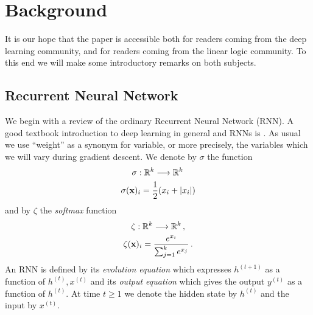 \documentclass[english,letter paper,12pt,leqno]{article}
\theoremstyle{example}
\numberwithin{equation}{section}
\begin{document}




\section{Background}

It is our hope that the paper is accessible both for readers coming from the deep learning community, and for readers coming from the linear logic community. To this end we will make some introductory remarks on both subjects.

\subsection{Recurrent Neural Network}

We begin with a review of the ordinary Recurrent Neural Network (RNN). A good textbook introduction to deep learning in general and RNNs is \cite{dlbook}. As usual we use ``weight'' as a synonym for variable, or more precisely, the variables which we will vary during gradient descent. We denote by $\sigma$ the function
\begin{gather*}
\sigma: \mathbb{R}^k \longrightarrow \mathbb{R}^k\,\\
\sigma( \bold{x} )_i = \frac{1}{2}( x_i + |x_i| )
\end{gather*}
and by $\zeta$ the \emph{softmax} function
\begin{gather*}
\zeta: \mathbb{R}^k \longrightarrow \mathbb{R}^k\,,\\
\zeta(\bold{x})_i = \frac{e^{x_i}}{\sum_{j=1}^k e^{x_j}}\,.
\end{gather*}
An RNN is defined by its \emph{evolution equation} which expresses $h^{(t+1)}$ as a function of $h^{(t)}, x^{(t)}$ and its \emph{output equation} which gives the output $y^{(t)}$ as a function of $h^{(t)}$. At time $t \ge 1$ we denote the hidden state by $h^{(t)}$ and the input by $x^{(t)}$. 
\end{document}
